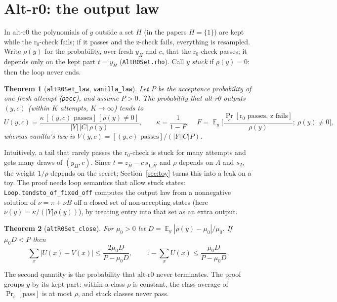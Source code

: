 \documentclass[11pt]{article}
\newtheorem{theorem}{Theorem}
\theoremstyle{definition}
\theoremstyle{remark}
\newcommand{\lean}[1]{\texttt{#1}}
\renewcommand{\Pr}{\mathop{\mathrm{Pr}}}
\begin{document}
\section{Alt-r0: the output law}\label{sec:altr0}

In alt-r0 the polynomials of $y$ outside a set $H$ (in the papers $H = \{1\}$) are kept while the
r$_0$-check fails; if it passes and the z-check fails, everything is resampled. Write $\rho(y)$
for the probability, over fresh $y_H$ and $c$, that the r$_0$-check passes; it depends only on
the kept part $t = y_{\bar H}$ (\lean{AltR0Set.rho}). Call $y$ \emph{stuck} if $\rho(y) = 0$: then
the loop never ends.

\begin{theorem}[\lean{altR0Set\_law}, \lean{vanilla\_law}]
Let $P$ be the acceptance probability of one fresh attempt (\lean{pacc}), and assume $P > 0$. The
probability that alt-r0 outputs $(y,c)$ (within $K$ attempts, $K\to\infty$) tends to
\[
  U(y,c) = \frac{\kappa\,[(y,c)\text{ passes}]\,[\rho(y)\neq 0]}{|Y|\,|C|\,\rho(y)},
  \qquad \kappa = \frac1{1-F},\quad
  F = \mathop{\mathbb E}_y\Big[\frac{\Pr_c[\text{r}_0 \text{ passes, z fails}]}{\rho(y)};\ \rho(y)\ne0\Big],
\]
whereas vanilla's law is $V(y,c) = [(y,c)\text{ passes}]/(|Y||C|P)$.
\end{theorem}

Intuitively, a tail that rarely passes the r$_0$-check is stuck for many attempts and gets many
draws of $(y_H, c)$. Since $t = z_{\bar H} - c\,s_{1,\bar H}$ and $\rho$ depends on $A$ and $s_2$,
the weight $1/\rho$ depends on the secret; Section~\ref{sec:toy} turns this into a leak on a toy.
The proof needs loop semantics that allow stuck states: \lean{Loop.tendsto\_of\_fixed\_off}
computes the output law from a nonnegative solution of $\nu = \pi + \nu B$ off a closed set of
non-accepting states (here $\nu(y) = \kappa/(|Y|\rho(y))$), by treating entry into that set as an
extra output.

\begin{theorem}[\lean{altR0Set\_close}]
For $\mu_0 > 0$ let $D = \mathop{\mathbb E}_y |\rho(y) - \mu_0| / \mu_0$. If $\mu_0 D < P$ then
\[
  \sum_x |U(x) - V(x)| \le \frac{2\mu_0 D}{P - \mu_0 D},
  \qquad 1 - \sum_x U(x) \le \frac{\mu_0 D}{P - \mu_0 D}.
\]
\end{theorem}
The second quantity is the probability that alt-r0 never terminates. The proof groups $y$ by its
kept part: within a class $\rho$ is constant, the class average of $\Pr_c[\text{pass}]$ is at most
$\rho$, and stuck classes never pass.
\end{document}
